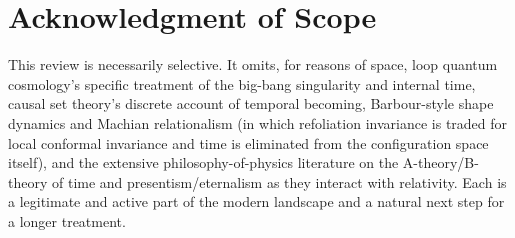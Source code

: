 \documentclass[11pt]{article}
\begin{document}
\section*{Acknowledgment of Scope}
This review is necessarily selective. It omits, for reasons of space, loop quantum cosmology's specific treatment of the big-bang singularity and internal time, causal set theory's discrete account of temporal becoming, Barbour-style shape dynamics and Machian relationalism (in which refoliation invariance is traded for local conformal invariance and time is eliminated from the configuration space itself), and the extensive philosophy-of-physics literature on the A-theory/B-theory of time and presentism/eternalism as they interact with relativity. Each is a legitimate and active part of the modern landscape and a natural next step for a longer treatment.
\end{document}

